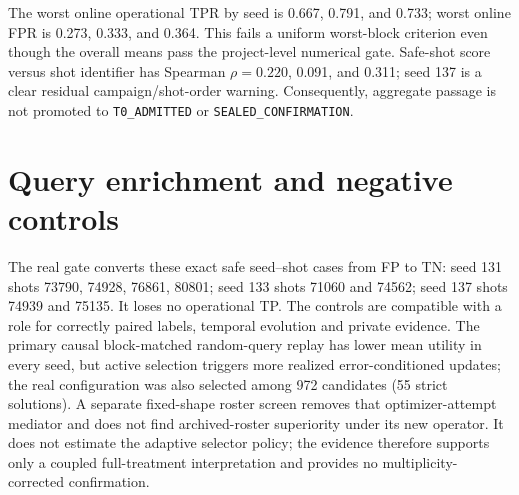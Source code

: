 \documentclass[10pt]{article}
\newcommand{\code}[1]{\nolinkurl{#1}}
\begin{document}
\begin{landscape}
\begin{table}[p]
\centering
\small

\caption{Four consecutive 90-shot blocks.  D/N composition varies because chronological order is preserved.  High block-2 FPR is the dominant unresolved temporal failure.}
\end{table}
\end{landscape}

The worst online operational TPR by seed is 0.667, 0.791, and 0.733; worst online FPR is 0.273, 0.333, and 0.364.  This fails a uniform worst-block criterion even though the overall means pass the project-level numerical gate.  Safe-shot score versus shot identifier has Spearman $\rho=0.220$, 0.091, and 0.311; seed 137 is a clear residual campaign/shot-order warning.  Consequently, aggregate passage is not promoted to \code{T0\_ADMITTED} or \code{SEALED\_CONFIRMATION}.

\section{Query enrichment and negative controls}

\begin{table}[h]
\centering

\caption{Queried-shot operational error enrichment.  MW $p$ is the one-sided Mann--Whitney value for the developed decision score and is descriptive because the score was developed on balanced360.}
\end{table}

\begin{table}[h]
\centering

\caption{Three-seed totals relative to the same v2.1 sealed trajectories.  A negative TP loss denotes a TP gain.}
\end{table}

The real gate converts these exact safe seed--shot cases from FP to TN: seed 131 shots 73790, 74928, 76861, 80801; seed 133 shots 71060 and 74562; seed 137 shots 74939 and 75135.  It loses no operational TP.  The controls are compatible with a role for correctly paired labels, temporal evolution and private evidence.  The primary causal block-matched random-query replay has lower mean utility in every seed, but active selection triggers more realized error-conditioned updates; the real configuration was also selected among 972 candidates (55 strict solutions).  A separate fixed-shape roster screen removes that optimizer-attempt mediator and does not find archived-roster superiority under its new operator.  It does not estimate the adaptive selector policy; the evidence therefore supports only a coupled full-treatment interpretation and provides no multiplicity-corrected confirmation.
\end{document}

